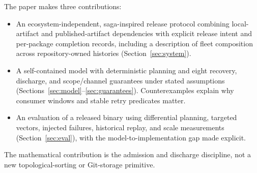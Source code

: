 The paper makes three contributions:
\begin{itemize}
\item An ecosystem-independent, saga-inspired release protocol combining
local-artifact and published-artifact dependencies with explicit release
intent and per-package completion records, including a description of fleet
composition across repository-owned histories
(Section~\ref{sec:system}).
\item A self-contained model with deterministic planning and eight recovery,
discharge, and scope/channel guarantees under stated assumptions
(Sections~\ref{sec:model}--\ref{sec:guarantees}). Counterexamples explain why
consumer windows and stable retry predicates matter.
\item An evaluation of a released binary using differential planning,
targeted vectors, injected failures, historical replay, and scale measurements
(Section~\ref{sec:eval}), with the model-to-implementation gap made explicit.
\end{itemize}

The mathematical contribution is the admission and discharge discipline,
not a new topological-sorting or Git-storage primitive.
